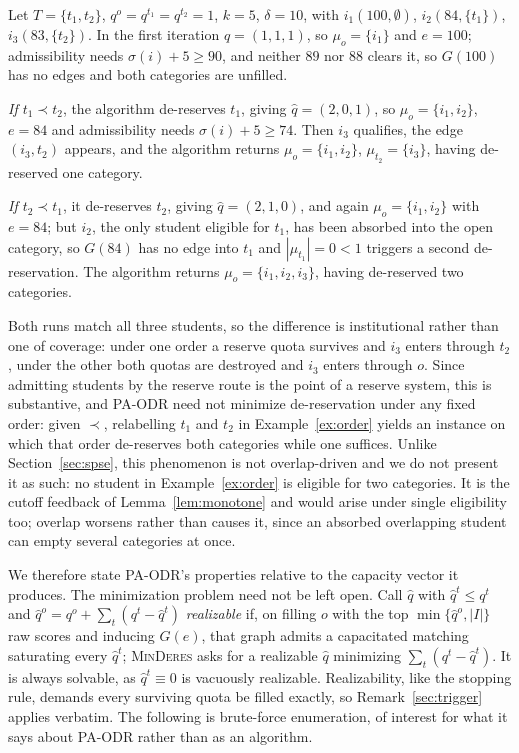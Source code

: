 \documentclass[runningheads]{llncs}
\begin{document}
\begin{example}
\label{ex:order}
Let $T=\{t_1,t_2\}$, $q^o=q^{t_1}=q^{t_2}=1$, $k=5$, $\delta=10$, with $i_1(100,\emptyset)$, $i_2(84,\{t_1\})$, $i_3(83,\{t_2\})$. In the first iteration $\hat q=(1,1,1)$, so $\mu_o=\{i_1\}$ and $e=100$; admissibility needs $\sigma(i)+5\ge90$, and neither $89$ nor $88$ clears it, so $G(100)$ has no edges and both categories are unfilled.

\emph{If $t_1\prec t_2$}, the algorithm de-reserves $t_1$, giving $\hat q=(2,0,1)$, so $\mu_o=\{i_1,i_2\}$, $e=84$ and admissibility needs $\sigma(i)+5\ge74$. Then $i_3$ qualifies, the edge $(i_3,t_2)$ appears, and the algorithm returns $\mu_o=\{i_1,i_2\}$, $\mu_{t_2}=\{i_3\}$, having de-reserved one category.

\emph{If $t_2\prec t_1$}, it de-reserves $t_2$, giving $\hat q=(2,1,0)$, and again $\mu_o=\{i_1,i_2\}$ with $e=84$; but $i_2$, the only student eligible for $t_1$, has been absorbed into the open category, so $G(84)$ has no edge into $t_1$ and $|\mu_{t_1}|=0<1$ triggers a second de-reservation. The algorithm returns $\mu_o=\{i_1,i_2,i_3\}$, having de-reserved two categories.
\end{example}

Both runs match all three students, so the difference is institutional rather than one of coverage: under one order a reserve quota survives and $i_3$ enters through $t_2$, under the other both quotas are destroyed and $i_3$ enters through $o$. Since admitting students by the reserve route is the point of a reserve system, this is substantive, and PA-ODR need not minimize de-reservation under any fixed order: given $\prec$, relabelling $t_1$ and $t_2$ in Example~\ref{ex:order} yields an instance on which that order de-reserves both categories while one suffices. Unlike Section~\ref{sec:spse}, this phenomenon is not overlap-driven and we do not present it as such: no student in Example~\ref{ex:order} is eligible for two categories. It is the cutoff feedback of Lemma~\ref{lem:monotone} and would arise under single eligibility too; overlap worsens rather than causes it, since an absorbed overlapping student can empty several categories at once.

We therefore state PA-ODR's properties relative to the capacity vector it produces. The minimization problem need not be left open. Call $\hat q$ with $\hat q^t\le q^t$ and $\hat q^o=q^o+\sum_{t}(q^t-\hat q^t)$ \emph{realizable} if, on filling $o$ with the top $\min\{\hat q^o,|I|\}$ raw scores and inducing $G(e)$, that graph admits a capacitated matching saturating every $\hat q^t$; \textsc{MinDeres} asks for a realizable $\hat q$ minimizing $\sum_t(q^t-\hat q^t)$. It is always solvable, as $\hat q^t\equiv0$ is vacuously realizable. Realizability, like the stopping rule, demands every surviving quota be filled exactly, so Remark~\ref{sec:trigger} applies verbatim. The following is brute-force enumeration, of interest for what it says about PA-ODR rather than as an algorithm.
\end{document}
